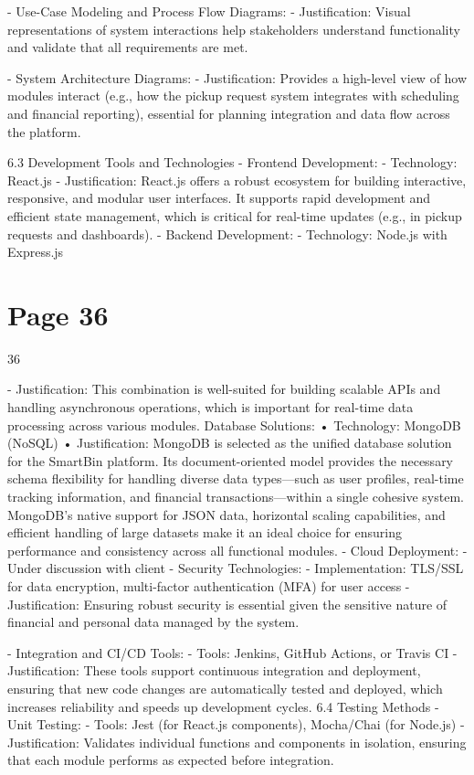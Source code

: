 \documentclass{article}
\begin{document}
- Use-Case Modeling and Process Flow Diagrams:   
  - Justification: Visual representations of system interactions help stakeholders understand 
functionality and validate that all requirements are met. 
 
- System Architecture Diagrams:   
  - Justification: Provides a high-level view of how modules interact (e.g., how the pickup 
request system integrates with scheduling and financial reporting), essential for planning 
integration and data flow across the platform. 
 
6.3 Development Tools and Technologies 
- Frontend Development:   
  - Technology: React.js   
  - Justification: React.js offers a robust ecosystem for building interactive, responsive, and 
modular user interfaces. It supports rapid development and efficient state management, which 
is critical for real-time updates (e.g., in pickup requests and dashboards). 
- Backend Development:   
  - Technology: Node.js with Express.js   

\section*{Page 36}
   
 
 36  
 
  - Justification: This combination is well-suited for building scalable APIs and handling 
asynchronous operations, which is important for real-time data processing across various 
modules. 
Database Solutions:  
• Technology: MongoDB (NoSQL) 
• Justification: MongoDB is selected as the unified database solution for the SmartBin 
platform. Its document-oriented model provides the necessary schema flexibility for 
handling diverse data types—such as user profiles, real-time tracking information, and 
financial transactions—within a single cohesive system. MongoDB's native support for 
JSON data, horizontal scaling capabilities, and efficient handling of large datasets make 
it an ideal choice for ensuring performance and consistency across all functional 
modules. 
- Cloud Deployment:   
- Under discussion with client 
- Security Technologies:   
  - Implementation: TLS/SSL for data encryption, multi-factor authentication (MFA) for user 
access   
  - Justification: Ensuring robust security is essential given the sensitive nature of financial and 
personal data managed by the system. 
 
- Integration and CI/CD Tools:   
  - Tools: Jenkins, GitHub Actions, or Travis CI   
  - Justification: These tools support continuous integration and deployment, ensuring that new 
code changes are automatically tested and deployed, which increases reliability and speeds up 
development cycles. 
6.4 Testing Methods 
- Unit Testing:   
  - Tools: Jest (for React.js components), Mocha/Chai (for Node.js)   
  - Justification: Validates individual functions and components in isolation, ensuring that each 
module performs as expected before integration. 
\end{document}
